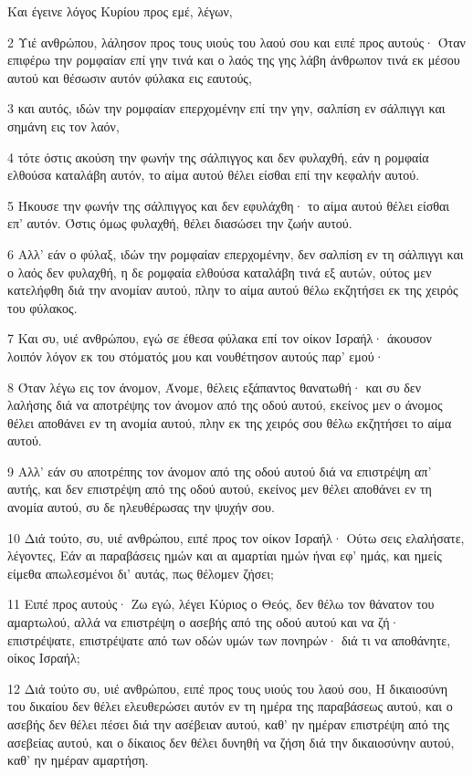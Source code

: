 \par Και έγεινε λόγος Κυρίου προς εμέ, λέγων,
\par 2 Υιέ ανθρώπου, λάλησον προς τους υιούς του λαού σου και ειπέ προς αυτούς· Όταν επιφέρω την ρομφαίαν επί γην τινά και ο λαός της γης λάβη άνθρωπον τινά εκ μέσου αυτού και θέσωσιν αυτόν φύλακα εις εαυτούς,
\par 3 και αυτός, ιδών την ρομφαίαν επερχομένην επί την γην, σαλπίση εν σάλπιγγι και σημάνη εις τον λαόν,
\par 4 τότε όστις ακούση την φωνήν της σάλπιγγος και δεν φυλαχθή, εάν η ρομφαία ελθούσα καταλάβη αυτόν, το αίμα αυτού θέλει είσθαι επί την κεφαλήν αυτού.
\par 5 Ήκουσε την φωνήν της σάλπιγγος και δεν εφυλάχθη· το αίμα αυτού θέλει είσθαι επ' αυτόν. Όστις όμως φυλαχθή, θέλει διασώσει την ζωήν αυτού.
\par 6 Αλλ' εάν ο φύλαξ, ιδών την ρομφαίαν επερχομένην, δεν σαλπίση εν τη σάλπιγγι και ο λαός δεν φυλαχθή, η δε ρομφαία ελθούσα καταλάβη τινά εξ αυτών, ούτος μεν κατελήφθη διά την ανομίαν αυτού, πλην το αίμα αυτού θέλω εκζητήσει εκ της χειρός του φύλακος.
\par 7 Και συ, υιέ ανθρώπου, εγώ σε έθεσα φύλακα επί τον οίκον Ισραήλ· άκουσον λοιπόν λόγον εκ του στόματός μου και νουθέτησον αυτούς παρ' εμού·
\par 8 Όταν λέγω εις τον άνομον, Άνομε, θέλεις εξάπαντος θανατωθή· και συ δεν λαλήσης διά να αποτρέψης τον άνομον από της οδού αυτού, εκείνος μεν ο άνομος θέλει αποθάνει εν τη ανομία αυτού, πλην εκ της χειρός σου θέλω εκζητήσει το αίμα αυτού.
\par 9 Αλλ' εάν συ αποτρέπης τον άνομον από της οδού αυτού διά να επιστρέψη απ' αυτής, και δεν επιστρέψη από της οδού αυτού, εκείνος μεν θέλει αποθάνει εν τη ανομία αυτού, συ δε ηλευθέρωσας την ψυχήν σου.
\par 10 Διά τούτο, συ, υιέ ανθρώπου, ειπέ προς τον οίκον Ισραήλ· Ούτω σεις ελαλήσατε, λέγοντες, Εάν αι παραβάσεις ημών και αι αμαρτίαι ημών ήναι εφ' ημάς, και ημείς είμεθα απωλεσμένοι δι' αυτάς, πως θέλομεν ζήσει;
\par 11 Ειπέ προς αυτούς· Ζω εγώ, λέγει Κύριος ο Θεός, δεν θέλω τον θάνατον του αμαρτωλού, αλλά να επιστρέψη ο ασεβής από της οδού αυτού και να ζή· επιστρέψατε, επιστρέψατε από των οδών υμών των πονηρών· διά τι να αποθάνητε, οίκος Ισραήλ;
\par 12 Διά τούτο συ, υιέ ανθρώπου, ειπέ προς τους υιούς του λαού σου, Η δικαιοσύνη του δικαίου δεν θέλει ελευθερώσει αυτόν εν τη ημέρα της παραβάσεως αυτού, και ο ασεβής δεν θέλει πέσει διά την ασέβειαν αυτού, καθ' ην ημέραν επιστρέψη από της ασεβείας αυτού, και ο δίκαιος δεν θέλει δυνηθή να ζήση διά την δικαιοσύνην αυτού, καθ' ην ημέραν αμαρτήση.
